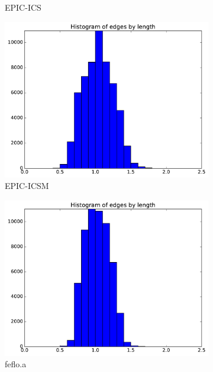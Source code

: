 \documentclass[3p,times,procedia,number]{elsarticle}
\begin{document}
\begin{figure}
\begin{subfigure}{.16\textwidth}
\caption{EPIC-ICS}
\end{subfigure}
\begin{subfigure}{.16\textwidth}
\centering
\includegraphics[width=\textwidth]{epic-icsm-cube-linear-length.pdf}
\caption{EPIC-ICSM}
\end{subfigure}
\begin{subfigure}{.16\textwidth}
\centering
\includegraphics[width=\textwidth]{fefloa-cube-linear-length.pdf}
\caption{feflo.a}
\end{subfigure}
\begin{subfigure}{.16\textwidth}
\centering

\end{subfigure}
\end{figure}
\end{document}

